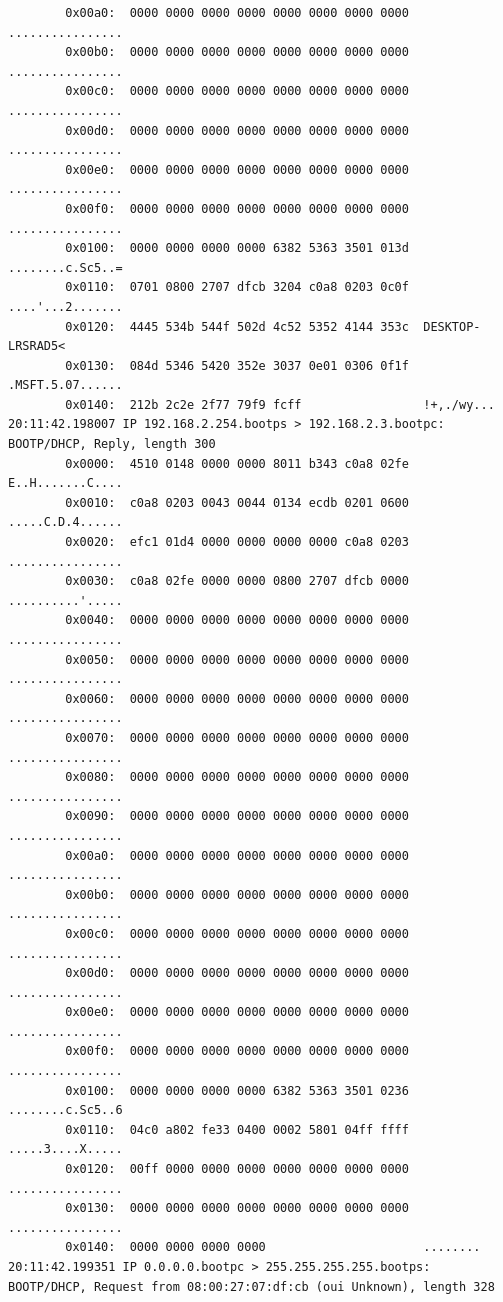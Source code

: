 \documentclass{mwart} %
\begin{document}
\begin{footnotesize}
\begin{verbatim}
        0x00a0:  0000 0000 0000 0000 0000 0000 0000 0000  ................
        0x00b0:  0000 0000 0000 0000 0000 0000 0000 0000  ................
        0x00c0:  0000 0000 0000 0000 0000 0000 0000 0000  ................
        0x00d0:  0000 0000 0000 0000 0000 0000 0000 0000  ................
        0x00e0:  0000 0000 0000 0000 0000 0000 0000 0000  ................
        0x00f0:  0000 0000 0000 0000 0000 0000 0000 0000  ................
        0x0100:  0000 0000 0000 0000 6382 5363 3501 013d  ........c.Sc5..=
        0x0110:  0701 0800 2707 dfcb 3204 c0a8 0203 0c0f  ....'...2.......
        0x0120:  4445 534b 544f 502d 4c52 5352 4144 353c  DESKTOP-LRSRAD5<
        0x0130:  084d 5346 5420 352e 3037 0e01 0306 0f1f  .MSFT.5.07......
        0x0140:  212b 2c2e 2f77 79f9 fcff                 !+,./wy...
20:11:42.198007 IP 192.168.2.254.bootps > 192.168.2.3.bootpc: BOOTP/DHCP, Reply, length 300 
        0x0000:  4510 0148 0000 0000 8011 b343 c0a8 02fe  E..H.......C....
        0x0010:  c0a8 0203 0043 0044 0134 ecdb 0201 0600  .....C.D.4......
        0x0020:  efc1 01d4 0000 0000 0000 0000 c0a8 0203  ................
        0x0030:  c0a8 02fe 0000 0000 0800 2707 dfcb 0000  ..........'.....
        0x0040:  0000 0000 0000 0000 0000 0000 0000 0000  ................
        0x0050:  0000 0000 0000 0000 0000 0000 0000 0000  ................
        0x0060:  0000 0000 0000 0000 0000 0000 0000 0000  ................
        0x0070:  0000 0000 0000 0000 0000 0000 0000 0000  ................
        0x0080:  0000 0000 0000 0000 0000 0000 0000 0000  ................
        0x0090:  0000 0000 0000 0000 0000 0000 0000 0000  ................
        0x00a0:  0000 0000 0000 0000 0000 0000 0000 0000  ................
        0x00b0:  0000 0000 0000 0000 0000 0000 0000 0000  ................
        0x00c0:  0000 0000 0000 0000 0000 0000 0000 0000  ................
        0x00d0:  0000 0000 0000 0000 0000 0000 0000 0000  ................
        0x00e0:  0000 0000 0000 0000 0000 0000 0000 0000  ................
        0x00f0:  0000 0000 0000 0000 0000 0000 0000 0000  ................
        0x0100:  0000 0000 0000 0000 6382 5363 3501 0236  ........c.Sc5..6
        0x0110:  04c0 a802 fe33 0400 0002 5801 04ff ffff  .....3....X.....
        0x0120:  00ff 0000 0000 0000 0000 0000 0000 0000  ................
        0x0130:  0000 0000 0000 0000 0000 0000 0000 0000  ................
        0x0140:  0000 0000 0000 0000                      ........
20:11:42.199351 IP 0.0.0.0.bootpc > 255.255.255.255.bootps: BOOTP/DHCP, Request from 08:00:27:07:df:cb (oui Unknown), length 328       

\end{verbatim}
\end{footnotesize}
\end{document}
